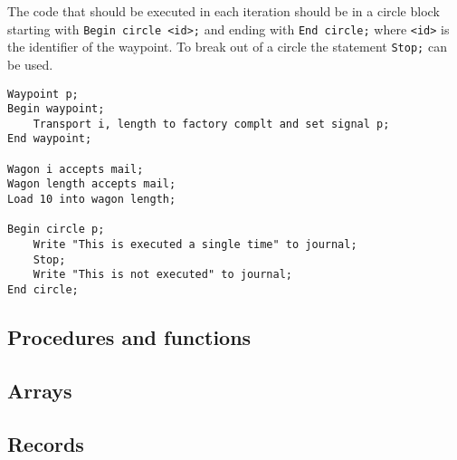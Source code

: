 \documentclass[10pt,a4paper,notitlepage]{article}
\begin{document}
The code that should be executed in each iteration should be in a circle block starting with \texttt{Begin circle <id>;} and ending with \texttt{End circle;} where \texttt{<id>} is the identifier of the waypoint. To break out of a circle the statement \texttt{Stop;} can be used.

\begin{lstlisting}
Waypoint p;
Begin waypoint;
	Transport i, length to factory complt and set signal p;
End waypoint;

Wagon i accepts mail;
Wagon length accepts mail;
Load 10 into wagon length;

Begin circle p;
	Write "This is executed a single time" to journal;
	Stop;
	Write "This is not executed" to journal;
End circle;
\end{lstlisting}

\subsection{Procedures and functions}

\subsection{Arrays}

\subsection{Records}
\end{document}
